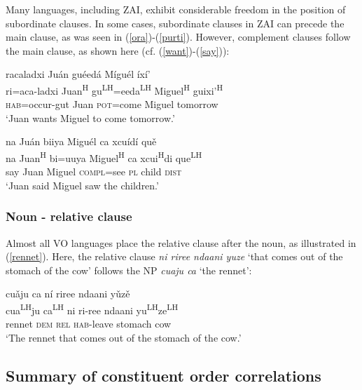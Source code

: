 Many languages, including ZAI, exhibit considerable freedom in the position of subordinate clauses. In some cases,  subordinate clauses in ZAI can precede the main clause, as was seen in (\ref{ora})-(\ref{purti}). However, complement clauses follow the main clause, as shown here (cf. (\ref{want})-(\ref{say})): 


\ea\label{want}
\glll racaladxi Juán guéedá M\'{i}guél \'{i}x\'{i}' \\
ri=aca-ladxi Juan\textsuperscript{H} gu\textsuperscript{LH}=eeda\textsuperscript{LH} Miguel\textsuperscript{H}  guixi'\textsuperscript{H}  \\
\textsc{hab}=occur-gut Juan \textsc{pot}=come Miguel tomorrow \\
\glt `Juan wants Miguel to come tomorrow.' 
\z

\ea\label{say}
\glll na Juán biiya Miguél ca xcu\'{i}d\'{i} qu\v{e} \\
na Juan\textsuperscript{H} bi=uuya Miguel\textsuperscript{H} ca xcui\textsuperscript{H}di que\textsuperscript{LH} \\
say Juan Miguel \textsc{compl}=see \textsc{pl} child \textsc{dist} \\
\glt `Juan said Miguel saw the children.' 
\z

	
	
\subsubsection{Noun - relative clause}

Almost all VO languages place the relative clause after the noun, as illustrated in (\ref{rennet}). Here, the relative clause \textit{ni riree ndaani yuze} `that comes out of the stomach of the cow' follows the NP \textit{cuaju ca} `the rennet':

\ea\label{rennet}
\glll cu\v{a}ju ca n\'{i} riree ndaani y\v{u}z\v{e} \\
cua\textsuperscript{LH}ju ca\textsuperscript{LH} ni ri-ree ndaani yu\textsuperscript{LH}ze\textsuperscript{LH} \\
rennet \textsc{dem} \textsc{rel} \textsc{hab}-leave stomach cow \\
\glt `The rennet that comes out of the stomach of the cow.'
\z



\subsection{Summary of constituent order correlations}

